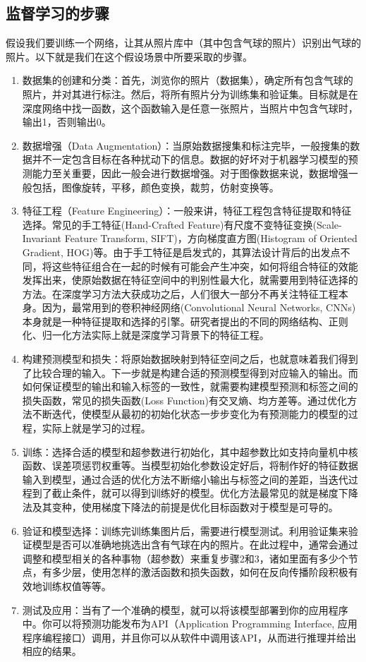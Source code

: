 \documentclass[UTF8]{ctexart}
\begin{document}
\subsection{监督学习的步骤}
假设我们要训练一个网络，让其从照片库中（其中包含气球的照片）识别出气球的照片。以下就是我们在这个假设场景中所要采取的步骤。
\begin{enumerate}
	\item 数据集的创建和分类：首先，浏览你的照片（数据集），确定所有包含气球的照片，并对其进行标注。然后，将所有照片分为训练集和验证集。目标就是在深度网络中找一函数，这个函数输入是任意一张照片，当照片中包含气球时，输出1，否则输出0。
	\item 数据增强（Data Augmentation）：当原始数据搜集和标注完毕，一般搜集的数据并不一定包含目标在各种扰动下的信息。数据的好坏对于机器学习模型的预测能力至关重要，因此一般会进行数据增强。对于图像数据来说，数据增强一般包括，图像旋转，平移，颜色变换，裁剪，仿射变换等。
	\item 特征工程（Feature Engineering）：一般来讲，特征工程包含特征提取和特征选择。常见的手工特征(Hand-Crafted Feature)有尺度不变特征变换(Scale-Invariant Feature Transform, SIFT)，方向梯度直方图(Histogram of Oriented Gradient, HOG)等。由于手工特征是启发式的，其算法设计背后的出发点不同，将这些特征组合在一起的时候有可能会产生冲突，如何将组合特征的效能发挥出来，使原始数据在特征空间中的判别性最大化，就需要用到特征选择的方法。在深度学习方法大获成功之后，人们很大一部分不再关注特征工程本身。因为，最常用到的卷积神经网络(Convolutional Neural Networks, CNNs)本身就是一种特征提取和选择的引擎。研究者提出的不同的网络结构、正则化、归一化方法实际上就是深度学习背景下的特征工程。
	\item 构建预测模型和损失：将原始数据映射到特征空间之后，也就意味着我们得到了比较合理的输入。下一步就是构建合适的预测模型得到对应输入的输出。而如何保证模型的输出和输入标签的一致性，就需要构建模型预测和标签之间的损失函数，常见的损失函数(Loss Function)有交叉熵、均方差等。通过优化方法不断迭代，使模型从最初的初始化状态一步步变化为有预测能力的模型的过程，实际上就是学习的过程。
	\item 训练：选择合适的模型和超参数进行初始化，其中超参数比如支持向量机中核函数、误差项惩罚权重等。当模型初始化参数设定好后，将制作好的特征数据输入到模型，通过合适的优化方法不断缩小输出与标签之间的差距，当迭代过程到了截止条件，就可以得到训练好的模型。优化方法最常见的就是梯度下降法及其变种，使用梯度下降法的前提是优化目标函数对于模型是可导的。
	\item 验证和模型选择：训练完训练集图片后，需要进行模型测试。利用验证集来验证模型是否可以准确地挑选出含有气球在内的照片。在此过程中，通常会通过调整和模型相关的各种事物（超参数）来重复步骤2和3，诸如里面有多少个节点，有多少层，使用怎样的激活函数和损失函数，如何在反向传播阶段积极有效地训练权值等等。
	\item 测试及应用：当有了一个准确的模型，就可以将该模型部署到你的应用程序中。你可以将预测功能发布为API（Application Programming Interface, 应用程序编程接口）调用，并且你可以从软件中调用该API，从而进行推理并给出相应的结果。
\end{enumerate}
\end{document}

